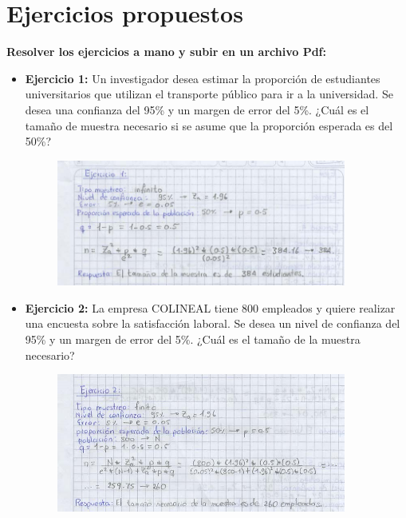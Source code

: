 \documentclass[12pt]{article}
\begin{document}
    
  
    \section*{\centering Ejercicios propuestos}

        \vspace{0.6cm}
        \noindent \textbf{Resolver los ejercicios a mano y subir en un archivo  Pdf:}

        \vspace{0.6cm}
        \begin{itemize}
            \item \textbf{Ejercicio 1:} Un investigador desea estimar la proporción de estudiantes universitarios que utilizan el transporte público para ir a la universidad. Se desea una confianza del 95\% y un margen de error del 5\%. ¿Cuál es el tamaño de muestra necesario si se asume que la proporción esperada es del 50\%?
                \begin{figure}[!h]
                    \centering
                    \includegraphics[width=0.9\textwidth]{Img/Tarea1_ej1.jpeg}
                \end{figure}
            
            \item \textbf{Ejercicio 2:} La empresa COLINEAL tiene 800 empleados y quiere realizar una encuesta sobre la satisfacción laboral. Se desea un nivel de confianza del 95\% y un margen de error del 5\%. ¿Cuál es el tamaño de la muestra necesario?
                \begin{figure}[!h]
                    \centering
                    \includegraphics[width=0.9\textwidth]{Img/Tarea1_ej2.jpeg}
                \end{figure}
            

\end{itemize}
\end{document}
